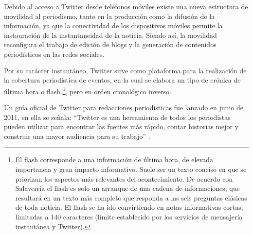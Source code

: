 Debido al acceso a Twitter desde teléfonos móviles existe una nueva estructura de movilidad al periodismo, tanto en la producción como la difusión de la información, ya que la conectividad de los dispositivos móviles permite la instauración de la instantaneidad de la noticia. Siendo así, la movilidad reconfigura el trabajo de edición de blogs y la generación de contenidos periodísticos en las redes sociales. 

Por su carácter instantáneo, Twitter sirve como plataforma para la realización de la cobertura periodística de eventos, en la cual se elabora un tipo de crónica de última hora o flash \footnote{El flash corresponde a una información de última hora, de elevada importancia y gran impacto informativo. Suele ser un texto conciso en que se priorizan los aspectos más relevantes del acontecimiento. De acuerdo con Salaverría el flash es solo un arranque de una cadena de informaciones, que resultará en un texto más completo que responda a las seis preguntas clásicas de toda noticia. El flash se ha ido convirtiendo en notas informativas cortas, limitadas a 140 caracteres (límite establecido por los servicios de mensajería instantánea y Twitter).\cite{salaverria2005redaccion}}, pero en orden cronológico inverso. 

Un guía oficial de Twitter para redacciones periodísticas fue lanzado en junio de 2011, en ella se señala: ``Twitter es una herramienta de todos los periodistas pueden utilizar para encontrar las fuentes más rápido, contar historias mejor y construir una mayor audiencia para su trabajo'' \cite{tweetsJournalist}.
